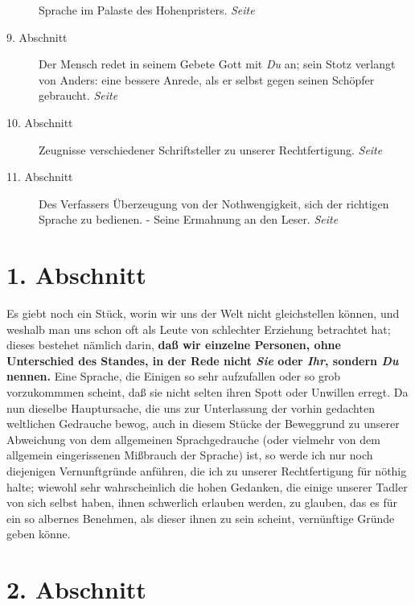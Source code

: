 \begin{description}
Sprache im Palaste des Hohenpristers.
\dotfill \textit{Seite~\pageref{kap10_ab8}}\\
\item[9. Abschnitt] Der Mensch redet in seinem Gebete Gott mit \textit{Du} an;
sein
Stotz verlangt von Anders: eine bessere Anrede, als er selbst gegen seinen
Schöpfer gebraucht.
\dotfill \textit{Seite~\pageref{kap10_ab9}}\\
\item[10. Abschnitt] Zeugnisse verschiedener Schriftsteller zu unserer
Rechtfertigung.
\dotfill \textit{Seite~\pageref{kap10_ab10}}\\
\item[11. Abschnitt] Des Verfassers Überzeugung von der Nothwengigkeit, sich
der richtigen Sprache zu bedienen. - Seine Ermahnung an den Leser.
\dotfill \textit{Seite~\pageref{kap10_ab11}}

\end{description}

\newpage

\section{1. Abschnitt} \label{kap10_ab1}

Es giebt noch ein Stück, worin wir uns der Welt nicht
gleichstellen können, und
weshalb man uns schon oft als Leute von schlechter Erziehung betrachtet hat;
dieses bestehet nämlich darin, \textbf{daß wir einzelne
Personen, ohne Unterschied des
Standes, in der Rede nicht \textit{Sie} oder \textit{Ihr}, sondern \textit{Du}
nennen.} Eine
Sprache, die Einigen so sehr aufzufallen oder so grob vorzukommmen scheint, daß
sie nicht selten ihren Spott oder Unwillen erregt. Da nun dieselbe Hauptursache,
die uns zur Unterlassung der vorhin gedachten weltlichen Gedrauche bewog, auch
in diesem Stücke der Beweggrund zu unserer Abweichung von dem allgemeinen
Sprachgedrauche (oder vielmehr von dem allgemein eingerissenen Mißbrauch der
Sprache) ist, so werde ich nur noch diejenigen Vernunftgründe anführen, die ich
zu unserer Rechtfertigung für nöthig halte; wiewohl sehr wahrscheinlich die
hohen Gedanken, die einige unserer Tadler von sich selbst haben, ihnen
schwerlich erlauben werden, zu glauben, das es für ein so albernes Benehmen, als
dieser ihnen zu sein scheint, vernünftige Gründe geben könne.

\section{2. Abschnitt} \label{kap10_ab2}

